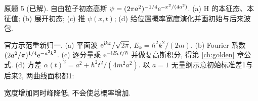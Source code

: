 \begin{exercise}\label{ex:2202-8-5}
原题 5 (已解). 自由粒子初态高斯 $\psi=(2\pi a^2)^{-1/4}\mathrm e^{-x^2/(4a^2)}$. (a) H 的本征态、本征值; (b) 展开初态; (c) 推 $\psi(x,t)$; (d) 给位置概率宽度演化并画初始与后来波包.
\end{exercise}
\begin{solution}
官方示范重新归一. (a) 平面波 $\mathrm e^{\mathrm i kx}/\sqrt{2\pi}$, $E_k=\hbar^2k^2/(2m)$. (b) Fourier 系数 $(2a^2/\pi)^{1/4}\mathrm e^{-a^2k^2}$. (c) 逐分量乘 $\mathrm e^{-\mathrm i E_kt/\hbar}$ 并做复高斯积分, 得第 \ref{ch:golden} 章公式. (d) 方差 $\alpha(t)^2=a^2+\hbar^2t^2/(4m^2a^2)$. 以 $a=1$ 无量纲示意初始标准差1与后来2, 两曲线面积都1:
\begin{center}\end{center}
宽度增加同时峰降低, 不会使总概率增加.
\end{solution}
